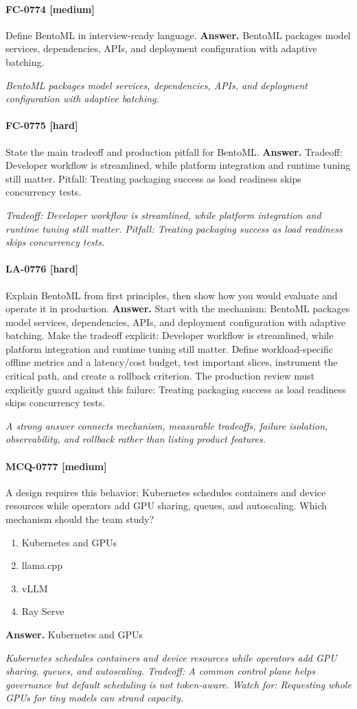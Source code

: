 \paragraph{FC-0774 [medium]} Define BentoML in interview-ready language.
\noindent\textbf{Answer.} BentoML packages model services, dependencies, APIs, and deployment configuration with adaptive batching.
\par\textit{BentoML packages model services, dependencies, APIs, and deployment configuration with adaptive batching.}
\paragraph{FC-0775 [hard]} State the main tradeoff and production pitfall for BentoML.
\noindent\textbf{Answer.} Tradeoff: Developer workflow is streamlined, while platform integration and runtime tuning still matter. Pitfall: Treating packaging success as load readiness skips concurrency tests.
\par\textit{Tradeoff: Developer workflow is streamlined, while platform integration and runtime tuning still matter. Pitfall: Treating packaging success as load readiness skips concurrency tests.}
\paragraph{LA-0776 [hard]} Explain BentoML from first principles, then show how you would evaluate and operate it in production.
\noindent\textbf{Answer.} Start with the mechanism: BentoML packages model services, dependencies, APIs, and deployment configuration with adaptive batching. Make the tradeoff explicit: Developer workflow is streamlined, while platform integration and runtime tuning still matter. Define workload-specific offline metrics and a latency/cost budget, test important slices, instrument the critical path, and create a rollback criterion. The production review must explicitly guard against this failure: Treating packaging success as load readiness skips concurrency tests.
\par\textit{A strong answer connects mechanism, measurable tradeoffs, failure isolation, observability, and rollback rather than listing product features.}
\paragraph{MCQ-0777 [medium]} A design requires this behavior: Kubernetes schedules containers and device resources while operators add GPU sharing, queues, and autoscaling. Which mechanism should the team study?
\begin{enumerate}[label=\Alph*.]
\item Kubernetes and GPUs
\item llama.cpp
\item vLLM
\item Ray Serve
\end{enumerate}
\noindent\textbf{Answer.} Kubernetes and GPUs
\par\textit{Kubernetes schedules containers and device resources while operators add GPU sharing, queues, and autoscaling. Tradeoff: A common control plane helps governance but default scheduling is not token-aware. Watch for: Requesting whole GPUs for tiny models can strand capacity.}
